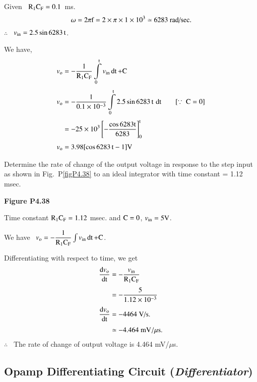 \begin{solution}
Given \ $\textrm{R}_{1}\textrm{C}_{\textrm{F}}=0.1$\, ms.
$$
\omega =2\pi \textrm{f}=2\times \pi\times 1\times 10^{3}\simeq 6283\text{~rad/sec.}
$$
$\therefore$~ $v_{\text{in}}=2.5\sin 6283\,\textrm{t}$.

We have,
\begin{align*}
v_{\rmo} &= -\frac{1}{\rmR_{1}\rmC_{\rmF}}\int\limits^{\rmt}_{0}v_{\text{in}}\dt +\rmC\\[3pt]
v_{\rmo} &= -\frac{1}{0.1\times 10^{-3}}\int\limits^{\rmt}_{0}2.5\sin 6283\,\rmt\,\dt\qquad [\because \ \rmC =0]\\[3pt]
&=-25\times 10^{3}\left[-\frac{\cos 6283\rmt}{6283}\right]^{\rmt}_{0}\\[3pt]
v_{\rmo} &= 3.98[\cos 6283\,\rmt-1]\rmV
\end{align*}
\end{solution}

\begin{problem}\label{prob4.39}
Determine the rate of change of the output voltage in response to the step input as shown in Fig.~P\ref{figP4.38} to an ideal integrator with time constant = 1.12 msec.
\begin{center}
{\bf Figure P4.38}
\end{center}
\end{problem}

\begin{solution}
Time constant $\textrm{R}_{1}\textrm{C}_{\textrm{F}}=1.12$ msec. and $\textrm{C}=0$, $v_{\text{in}}=5\textrm{V}$.

\medskip
We have \ $v_{\textrm{o}}=-\dfrac{1}{\textrm{R}_{1}\textrm{C}_{\textrm{F}}}\int v_{\text{in}}\operatorname{dt} +\textrm{C}$.

\medskip
Differentiating with respect to time, we get
\begin{align*}
\dfrac{\textrm{d} v_{\textrm{o}}}{\operatorname{dt}} &= -\frac{v_{\text{in}}}{\textrm{R}_{1}\textrm{C}_{\textrm{F}}}\\[3pt]
&= -\dfrac{5}{1.12\times 10^{-3}}\\[3pt]
\dfrac{\textrm{d} v_{\textrm{o}}}{\operatorname{dt}} &= -4464\text{~V/s.}\\[3pt]
&\simeq -4.464\text{~mV}/\mu\textrm{s}.
\end{align*}
$\therefore$~ The rate of change of output voltage is 4.464 mV/$\mu$s.
\end{solution}

\subsection{Opamp Differentiating Circuit ({\em Differentiator})}\label{sec4.6.6}

